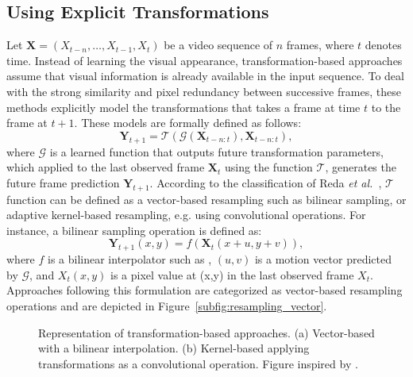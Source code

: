 \subsection{Using Explicit Transformations}
\label{subsec:m_transform}
Let ${\mathbf{X}=(X_{t-n},\ldots, X_{t-1}, X_t)}$ be a video sequence of $n$ frames, where $t$ denotes time. Instead of learning the visual appearance, transformation-based approaches assume that visual information is already available in the input sequence. To deal with the strong similarity and pixel redundancy between successive frames, these methods explicitly model the transformations that takes a frame at time $t$ to the frame at $t+1$. These models are formally defined as follows: 
\begin{equation}
\mathbf{Y}_{t+1}=\mathcal{T}\left(\mathcal{G}\left(\mathbf{X}_{t-n: t}\right), \mathbf{X}_{t-n: t}\right),
\end{equation}
where $\mathcal{G}$ is a learned function that outputs future transformation parameters, which applied to the last observed frame $\mathbf{X}_t$ using the function $\mathcal{T}$, generates the future frame prediction $\mathbf{Y}_{t+1}$. According to the classification of Reda \textit{et al.}~\cite{Reda2018}, $\mathcal{T}$ function can be defined as a vector-based resampling such as bilinear sampling, or adaptive kernel-based resampling, e.g. using convolutional operations. For instance, a bilinear sampling operation is defined as: 
\begin{equation}
\mathbf{Y}_{t+1}(x, y)=f\left(\mathbf{X}_{t}(x+u, y+v)\right),
\end{equation} 
where $f$ is a bilinear interpolator such as \cite{Memisevic2010,Memisevic2011,Liu2017}, $(u,v)$ is a motion vector predicted by $\mathcal{G}$, and $X_t(x,y)$ is a pixel value at (x,y) in the last observed frame $X_t$. Approaches following this formulation are categorized as vector-based resampling operations and are depicted in Figure~\ref{subfig:resampling_vector}. %
\begin{figure}[!t]
	\centering
	\subfloat[]{
		\resizebox{0.47\textwidth}{!}{}
		\label{subfig:resampling_vector}}
	\subfloat[]{
		\resizebox{0.47\textwidth}{!}{}
		\label{subfig:resampling_kernel}}
	\caption{Representation of transformation-based approaches. (a) Vector-based with a bilinear interpolation. (b) Kernel-based applying transformations as a convolutional operation. Figure inspired by \cite{Reda2018}.}
	\label{fig:resampling}
\end{figure}
